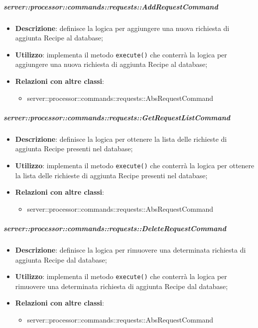         \subparagraph{server::processor::commands::requests::AddRequestCommand} %
        \label{subp:bdsm_app_server_processor_commands_requests_addrequestcommand}
        \begin{itemize}
          \item \textbf{Descrizione}: definisce la logica per aggiungere una nuova richiesta di aggiunta Recipe al database;
          \item \textbf{Utilizzo}: implementa il metodo \texttt{execute()} che conterrà la logica per aggiungere una nuova richiesta di aggiunta Recipe al database;
          \item \textbf{Relazioni con altre classi}:
            \begin{itemize}
              \item server::processor::commands::requests::AbsRequestCommand
            \end{itemize}
        \end{itemize}

        \subparagraph{server::processor::commands::requests::GetRequestListCommand} %
        \label{subp:bdsm_app_server_processor_commands_requests_getrequestlistcommand}
        \begin{itemize}
          \item \textbf{Descrizione}: definisce la logica per ottenere la lista delle richieste di aggiunta Recipe presenti nel database;
          \item \textbf{Utilizzo}: implementa il metodo \texttt{execute()} che conterrà la logica per ottenere la lista delle richieste di aggiunta Recipe presenti nel database;
          \item \textbf{Relazioni con altre classi}:
            \begin{itemize}
              \item server::processor::commands::requests::AbsRequestCommand
            \end{itemize}
        \end{itemize}

        \subparagraph{server::processor::commands::requests::DeleteRequestCommand} %
        \label{subp:bdsm_app_server_processor_commands_requests_deleterequestcommand}
        \begin{itemize}
          \item \textbf{Descrizione}: definisce la logica per rimuovere una determinata richiesta di aggiunta Recipe dal database;
          \item \textbf{Utilizzo}: implementa il metodo \texttt{execute()} che conterrà la logica per rimuovere una determinata richiesta di aggiunta Recipe dal database;
          \item \textbf{Relazioni con altre classi}:
            \begin{itemize}
              \item server::processor::commands::requests::AbsRequestCommand
            \end{itemize}
        \end{itemize}

